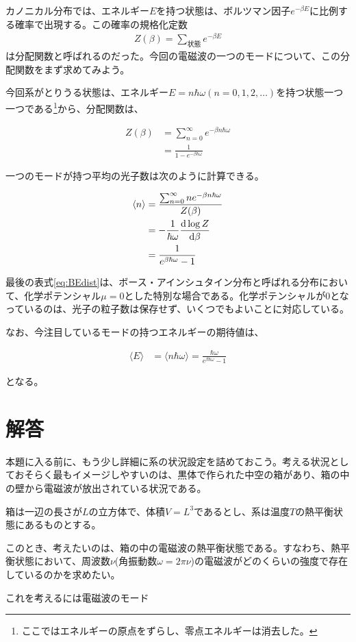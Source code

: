 \documentclass[uplatex,dvipdfmx]{jsarticle}
\newcommand{\ave}[1]{\langle #1 \rangle}
\begin{document}
カノニカル分布では、エネルギー$E$を持つ状態は、ボルツマン因子$e^{-\beta E}$に比例する確率で出現する。この確率の規格化定数
\begin{align}
    Z(\beta) = \sum_{状態} e^{-\beta E}    
\end{align}
は分配関数と呼ばれるのだった。今回の電磁波の一つのモードについて、この分配関数をまず求めてみよう。

今回系がとりうる状態は、エネルギー$E=n\hbar\omega(n=0,1,2,\dots)$を持つ状態一つ一つである\footnote{ここではエネルギーの原点をずらし、零点エネルギーは消去した。}から、分配関数は、

\begin{align}
    Z(\beta) &= \sum_{n=0}^{\infty} e^{-\beta n\hbar\omega} \\
    &= \frac{1}{1-e^{-\beta\hbar\omega}}
\end{align}


一つのモードが持つ平均の光子数は次のように計算できる。

\begin{align}
    \ave{n} &= \frac{\sum_{n=0}^{\infty} n e^{-\beta n\hbar\omega}}{Z(\beta)} \\
     &= -\frac{1}{\hbar\omega} \dv{\log{Z}}{\beta} \\
     &= \frac{1}{e^{\beta\hbar\omega}-1} \label{eq:BEdist}
\end{align}

最後の表式\ref{eq:BEdist}は、ボース・アインシュタイン分布と呼ばれる分布において、化学ポテンシャル$\mu=0$とした特別な場合である。化学ポテンシャルが0となっているのは、光子の粒子数は保存せず、いくつでもよいことに対応している。

なお、今注目しているモードの持つエネルギーの期待値は、

\begin{align}
    \ave{E} &= \ave{n\hbar\omega} = \frac{\hbar\omega}{e^{\beta\hbar\omega}-1}  
\end{align}

となる。

\section{解答}
本題に入る前に、もう少し詳細に系の状況設定を詰めておこう。考える状況としておそらく最もイメージしやすいのは、黒体で作られた中空の箱があり、箱の中の壁から電磁波が放出されている状況である。

箱は一辺の長さが$L$の立方体で、体積$V=L^3$であるとし、系は温度$T$の熱平衡状態にあるものとする。

このとき、考えたいのは、箱の中の電磁波の熱平衡状態である。すなわち、熱平衡状態において、周波数$\nu$(角振動数$\omega=2\pi\nu$)の電磁波がどのくらいの強度で存在しているのかを求めたい。

これを考えるには電磁波のモード
\end{document}
